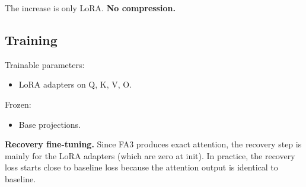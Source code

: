 The increase is only LoRA. \textbf{No compression.}

\subsection{Training}

Trainable parameters:

\begin{itemize}
\item LoRA adapters on Q, K, V, O.

\end{itemize}
Frozen:

\begin{itemize}
\item Base projections.

\end{itemize}
\textbf{Recovery fine-tuning.} Since FA3 produces exact attention, the 
recovery step is mainly for the LoRA adapters (which are zero at init). In 
practice, the recovery loss starts close to baseline loss because the 
attention output is identical to baseline.


